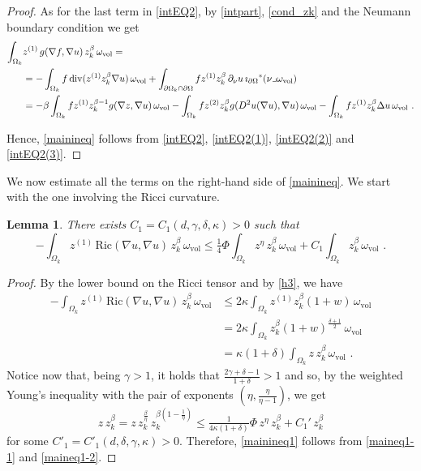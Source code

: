 \documentclass[10pt, a4paper, reqno, oneside]{amsart}
\theoremstyle{plain}
\theoremstyle{definition}
\theoremstyle{plain}
\newtheorem{lemma}[theo]{Lemma}
\theoremstyle{definition}
\theoremstyle{plain}
\renewcommand{\=}{:=}
\begin{document}
\begin{proof}
As for the last term in \eqref{intEQ2}, by \eqref{intpart}, \eqref{cond_zk} and the Neumann boundary condition we get
\begin{align}
\int_{\Omega_k}& z^{(1)} \, g(\nabla f,\nabla u) \, z_k^{\beta} \, \omega_{\mathrm{vol}} = \nonumber \\
&= -\int_{\Omega_k} f\,{\rm{div}}(z^{(1)}z_k^{\beta}\nabla u) \, \omega_{\mathrm{vol}} +\int_{\partial \Omega_k \cap \partial \Omega} fz^{(1)}z_k^\beta\,\partial_\nu u \, \imath_{\partial\Omega}{}^*(\nu \lrcorner \omega_{\mathrm{vol}})\nonumber \\
&= -\beta \int_{\Omega_k} f z^{(1)}z_k^{\beta-1}g(\nabla z,\nabla u)\, \omega_{\mathrm{vol}} -\int_{\Omega_k} fz^{(2)}z_k^{\beta}g(D^2u(\nabla u),\nabla u)\, \omega_{\mathrm{vol}} -\int_{\Omega_k} fz^{(1)}z_k^{\beta}\Delta u\, \omega_{\mathrm{vol}} \,\, . \label{intEQ2(3)}
\end{align}

Hence, \eqref{mainineq} follows from \eqref{intEQ2}, \eqref{intEQ2(1)}, \eqref{intEQ2(2)} and \eqref{intEQ2(3)}.
\end{proof}

We now estimate all the terms on the right-hand side of \eqref{mainineq}. We start with the one involving the Ricci curvature.

\begin{lemma}
There exists $C_1 = C_1(d,\gamma,\delta,\kappa)>0$ such that
\begin{equation} \label{mainineq1}
-\int_{\Omega_k} z^{(1)} \, \mathrm{Ric}(\nabla u,\nabla u) \, z_k^{\beta} \, \omega_{\mathrm{vol}} \leq \tfrac14\Phi \int_{\Omega_k} z^{\eta}\,z_k^{\beta}\, \omega_{\mathrm{vol}}  +C_1 \int_{\Omega_k} z_k^{\beta}\, \omega_{\mathrm{vol}} \,\, .
\end{equation}
\end{lemma}

\begin{proof}
By the lower bound on the Ricci tensor and by \eqref{h3}, we have
\begin{align}
-\int_{\Omega_k} z^{(1)} \, \mathrm{Ric}(\nabla u,\nabla u) \, z_k^{\beta} \, \omega_{\mathrm{vol}} & \leq 2\kappa \int_{\Omega_k} z^{(1)} z_k^{\beta}(1+w)\, \omega_{\mathrm{vol}} \nonumber \\
& = 2\kappa \int_{\Omega_k} z_k^{\beta}(1+w)^{\frac{\delta+1}2}\, \omega_{\mathrm{vol}} \nonumber \\
& = \kappa(1+\delta) \int_{\Omega_k}z \, z_k^{\beta}\, \omega_{\mathrm{vol}} \,\, . \label{maineq1-1}
\end{align}
Notice now that, being $\gamma>1$, it holds that $\frac{2\gamma+\delta-1}{1+\delta}>1$ and so, by the weighted Young's inequality with the pair of exponents $(\eta,\tfrac{\eta}{\eta-1})$, we get
\begin{equation} \label{maineq1-2}
z \, z_k^{\beta} = z \, z_k^{\frac{\beta}{\eta}} \, z_k^{\beta(1-\frac1{\eta})} \leq \tfrac1{4\kappa(1+\delta)}\Phi\, z^{\eta} \, z_k^{\beta} + C_1' \,z_k^{\beta}
\end{equation}
for some $C'_1 = C'_1(d,\delta,\gamma,\kappa)>0$. Therefore, \eqref{mainineq1} follows from \eqref{maineq1-1} and \eqref{maineq1-2}.
\end{proof}
\end{document}
